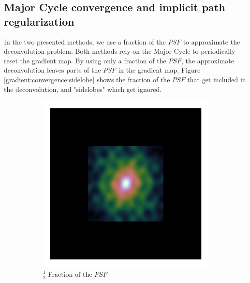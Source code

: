 \subsection{Major Cycle convergence and implicit path regularization}\label{gradients:pathreg}
In the two presented methods, we use a fraction of the $PSF$ to approximate the deconvolution problem. Both methods rely on the Major Cycle to periodically reset the gradient map. By using only a fraction of the $PSF$, the approximate deconvolution leaves parts of the $PSF$ in the gradient map. Figure \ref{gradient:convergence:sidelobe} shows the fraction of the $PSF$ that get included in the deconvolution, and "sidelobes" which get ignored.


\begin{figure}[h]
	\centering
	\begin{subfigure}[b]{0.3\linewidth}
		\includegraphics[width=\linewidth, clip, trim= 0.25in 0.25in 0.25in 0.25in]{./chapters/03.cd/simulated/psfCut.png}
		\caption{$\frac{1}{2}$ Fraction of the $PSF$}
	\end{subfigure}
	\begin{subfigure}[b]{0.3\linewidth}

\end{subfigure}
\end{figure}
